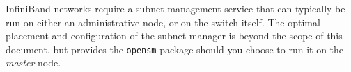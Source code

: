 \begin{center}
  \begin{tcolorbox}[]
InfiniBand networks require a subnet management service that can typically be
run on either an administrative node, or on the switch itself. The optimal placement and
configuration of the
subnet manager is beyond the scope of this document, but \baseOS{} provides the
\texttt{opensm} package should you choose to run it on the {\em master} node.
\end{tcolorbox}
\end{center}

